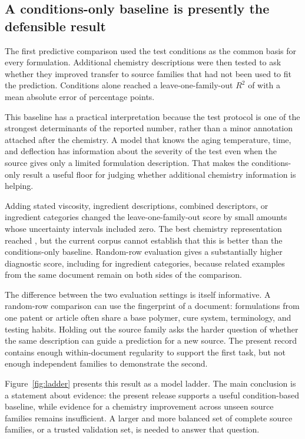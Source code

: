 \documentclass[10pt]{article}
\begin{document}
\subsection{A conditions-only baseline is presently the defensible result}
The first predictive comparison used the test conditions as the common basis
for every formulation. Additional chemistry descriptions were then tested to
ask whether they improved transfer to source families that had not been used
to fit the prediction. Conditions alone reached a leave-one-family-out
$R^2$ of \nLofoConditions{} with a mean absolute error of
\nLofoMaeConditions{} percentage points.

This baseline has a practical interpretation because the test protocol is one
of the strongest determinants of the reported number, rather than a minor
annotation attached after the chemistry. A model that knows the aging temperature,
time, and deflection has information about the severity of the test even when
the source gives only a limited formulation description. That makes the
conditions-only result a useful floor for judging whether additional chemistry
information is helping.

Adding stated viscosity, ingredient descriptions, combined descriptors, or
ingredient categories changed the leave-one-family-out score by small amounts
whose uncertainty intervals included zero. The best chemistry representation
reached \nLofoEmbWeighted{}, but the current corpus cannot establish that this
is better than the conditions-only baseline. Random-row evaluation gives a
substantially higher diagnostic score, including \nRandomCategories{} for
ingredient categories, because related examples from the same document remain
on both sides of the comparison.

The difference between the two evaluation settings is itself informative. A
random-row comparison can use the fingerprint of a document: formulations
from one patent or article often share a base polymer, cure system, terminology,
and testing habits. Holding out the source family asks the harder question of
whether the same description can guide a prediction for a new source. The
present record contains enough within-document regularity to support the first
task, but not enough independent families to demonstrate the second.

Figure~\ref{fig:ladder} presents this result as a model ladder. The main
conclusion is a statement about evidence: the present release supports a
useful condition-based baseline, while evidence for a chemistry improvement
across unseen source families remains insufficient. A larger and more balanced
set of complete source families, or a trusted validation set, is needed to
answer that question.
\end{document}
